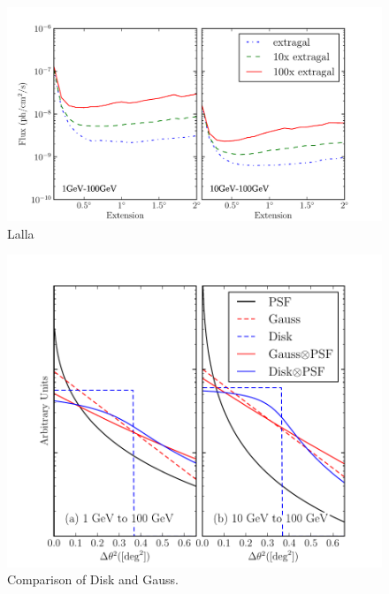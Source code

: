 \documentclass[preprint]{aastex}
\begin{document}
\clearpage

\begin{figure}
  \begin{center}
    \includegraphics{mc_plots/diff_factor_sensitivity.pdf}
    \end{center}
    \caption{Lalla}\label{diff_factor_sensitivity}
  \end{figure}

  \begin{figure}
    \begin{center}
      \includegraphics{mc_plots/compare_disk_gauss.pdf}
    \end{center}
    \caption{Comparison of Disk and Gauss.
    }\label{compare_disk_gauss}
  \end{figure}
\end{document}
